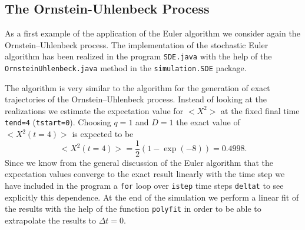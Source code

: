 \subsection{The Ornstein-Uhlenbeck Process}
As a first example of the application of the Euler algorithm
we consider again the Ornstein--Uhlenbeck process.
The implementation of the stochastic Euler algorithm has been 
realized in the program \texttt{SDE.java} with the help
of the \verb|OrnsteinUhlenbeck.java| method in the 
\verb|simulation.SDE| package.


The algorithm is very similar to the algorithm for the generation 
of exact trajectories of the Ornstein--Uhlenbeck process. 
Instead of looking at the realizations we estimate the expectation
value for $<X^2>$ at the fixed final time \texttt{tend=4} 
(\texttt{tstart=0}). Choosing $q=1$ and $D=1$ the exact value of
$<X^2(t=4)>$ is expected to be
\begin{equation*}
<X^2(t=4)> = \frac{1}{2}(1-\exp(-8)) = 0.4998.
\end{equation*}
Since we know from the general discussion of the Euler algorithm
that the expectation values converge to the exact result linearly 
with the time step we have included in the program a \texttt{for}
loop over \texttt{istep} time steps \texttt{deltat} to see explicitly this
dependence. At the end of the simulation we perform a linear fit
of the results with the help of the function \texttt{polyfit} in 
order to be able to extrapolate the results to $\Delta t =0$.

